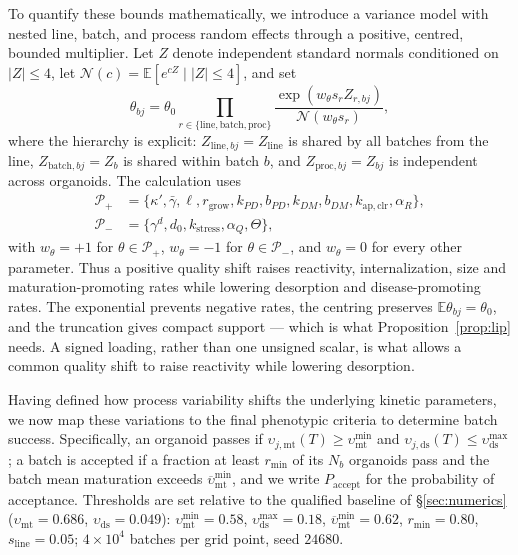 \documentclass[pdflatex,sn-mathphys-num]{sn-jnl}
\numberwithin{equation}{section}
\theoremstyle{thmstyleone}%
\theoremstyle{definition}
\theoremstyle{remark}
\begin{document}
To quantify these bounds mathematically, we introduce a variance model with nested line, batch, and process random effects through a positive, centred, bounded multiplier. Let $Z$ denote independent standard normals
conditioned on $|Z|\le4$, let
$\mathcal N(c)=\mathbb E[e^{cZ}\mid|Z|\le4]$, and set
\begin{equation}
\theta_{bj}=\theta_0\prod_{r\in\{\mathrm{line},\mathrm{batch},\mathrm{proc}\}}
\frac{\exp(w_\theta s_rZ_{r,bj})}{\mathcal N(w_\theta s_r)},
\label{eq:varmodel}
\end{equation}
where the hierarchy is explicit:
$Z_{\mathrm{line},bj}=Z_{\mathrm{line}}$ is shared by all batches from the
line, $Z_{\mathrm{batch},bj}=Z_b$ is shared within batch $b$, and
$Z_{\mathrm{proc},bj}=Z_{bj}$ is independent across organoids. The calculation
uses
\begin{align*}
\mathcal P_+&=\{\kappa',\bar\gamma,\ell,r_{\mathrm{grow}},k_{PD},b_{PD},
k_{DM},b_{DM},k_{\mathrm{ap,clr}},\alpha_R\},\\
\mathcal P_-&=\{\gamma^d,d_0,k_{\mathrm{stress}},\alpha_Q,\Theta\},
\end{align*}
with $w_\theta=+1$ for $\theta\in\mathcal P_+$,
$w_\theta=-1$ for $\theta\in\mathcal P_-$, and $w_\theta=0$ for every other
parameter. Thus a positive quality shift raises reactivity, internalization,
size and maturation-promoting rates while lowering desorption and
disease-promoting rates. The exponential prevents negative rates, the centring
preserves $\mathbb E\theta_{bj}=\theta_0$, and the truncation gives compact
support --- which is what Proposition~\ref{prop:lip} needs. A signed loading,
rather than one unsigned scalar, is what allows a common quality shift to raise
reactivity while lowering desorption.

Having defined how process variability shifts the underlying kinetic parameters, we now map these variations to the final phenotypic criteria to determine batch success. Specifically, an organoid passes if
$\upsilon_{j,\mathrm{mt}}(T)\ge\upsilon^{\min}_{\mathrm{mt}}$ and
$\upsilon_{j,\mathrm{ds}}(T)\le\upsilon^{\max}_{\mathrm{ds}}$; a batch is
accepted if a fraction at least $r_{\min}$ of its $N_b$ organoids pass
and the batch mean maturation exceeds
$\overline\upsilon^{\min}_{\mathrm{mt}}$, and we write
$P_{\mathrm{accept}}$ for the probability of acceptance. Thresholds are set
relative to the qualified baseline of \S\ref{sec:numerics}
($\upsilon_{\mathrm{mt}}=0.686$, $\upsilon_{\mathrm{ds}}=0.049$): $\upsilon^{\min}_{\mathrm{mt}}=0.58$,
$\upsilon^{\max}_{\mathrm{ds}}=0.18$,
$\overline\upsilon^{\min}_{\mathrm{mt}}=0.62$, $r_{\min}=0.80$,
$s_{\mathrm{line}}=0.05$; $4\times10^4$ batches per grid point, seed $24680$.
\end{document}
